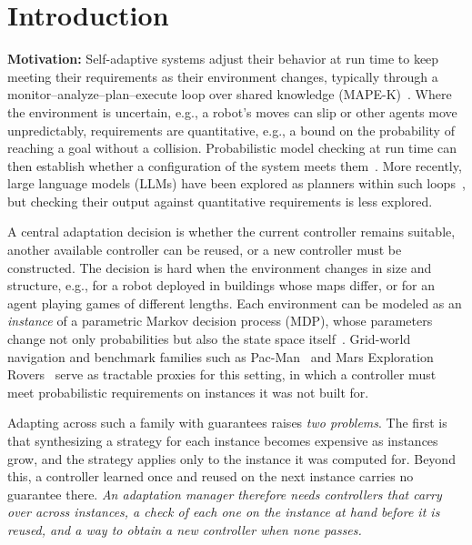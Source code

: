 \section{Introduction}
\label{sec:intro}

\textbf{Motivation:}
Self-adaptive systems adjust their behavior at run time to keep meeting their requirements as their environment changes, typically through a monitor--analyze--plan--execute loop over shared knowledge (MAPE-K)~\cite{TODO-Kephart2003-MAPE-K}.
Where the environment is uncertain, e.g., a robot's moves can slip or other agents move unpredictably, requirements are quantitative, e.g., a bound on the probability of reaching a goal without a collision.
Probabilistic model checking at run time can then establish whether a configuration of the system meets them~\cite{TODO-Calinescu2012-CACM-runtime-QV,TODO-Calinescu2018-ENTRUST}.
More recently, large language models (LLMs) have been explored as planners within such loops~\cite{TODO-Li2024-LLMs-in-SAS,TODO-Li2025-GenAI-SAS-roadmap}, but checking their output against quantitative requirements is less explored.

A central adaptation decision is whether the current controller remains suitable, another available controller can be reused, or a new controller must be constructed.
The decision is hard when the environment changes in size and structure, e.g., for a robot deployed in buildings whose maps differ, or for an agent playing games of different lengths.
Each environment can be modeled as an \textit{instance} of a parametric Markov decision process (MDP), whose parameters change not only probabilities but also the state space itself~\cite{TODO-Azeem2025-123Go}.
Grid-world navigation and benchmark families such as Pac-Man~\cite{TODO-QVBS} and Mars Exploration Rovers~\cite{TODO-MER-model-source} serve as tractable proxies for this setting, in which a controller must meet probabilistic requirements on instances it was not built for.

Adapting across such a family with guarantees raises \textit{two problems}.
The first is that synthesizing a strategy for each instance becomes expensive as instances grow, and the strategy applies only to the instance it was computed for.
Beyond this, a controller learned once and reused on the next instance carries no guarantee there.
\textit{An adaptation manager therefore needs controllers that carry over across instances, a check of each one on the instance at hand before it is reused, and a way to obtain a new controller when none passes.}

